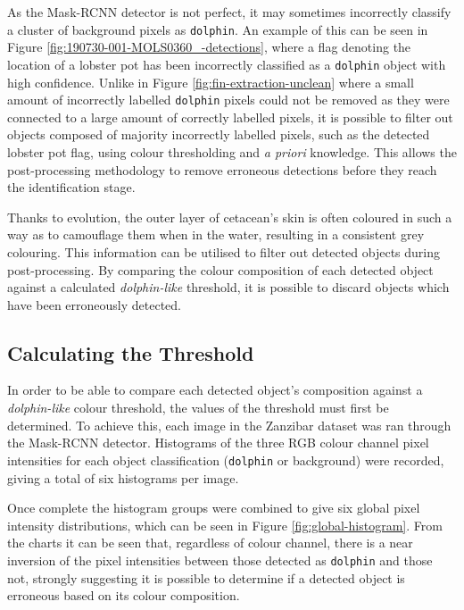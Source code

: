 As the Mask-RCNN detector is not perfect, it may sometimes incorrectly classify a cluster of background pixels as \texttt{dolphin}. An example of this can be seen in Figure \ref{fig:190730-001-MOLS0360_-detections}, where a flag denoting the location of a lobster pot has been incorrectly classified as a \texttt{dolphin} object with high confidence. Unlike in Figure \ref{fig:fin-extraction-unclean} where a small amount of incorrectly labelled \texttt{dolphin} pixels could not be removed as they were connected to a large amount of correctly labelled pixels, it is possible to filter out objects composed of majority incorrectly labelled pixels, such as the detected lobster pot flag, using colour thresholding and \textit{a priori} knowledge. This allows the post-processing methodology to remove erroneous detections before they reach the identification stage. 

Thanks to evolution, the outer layer of cetacean's skin is often coloured in such a way as to camouflage them when in the water, resulting in a consistent grey colouring. This information can be utilised to filter out detected objects during post-processing. By comparing the colour composition of each detected object against a calculated \textit{dolphin-like} threshold, it is possible to discard objects which have been erroneously detected. 

\subsection{Calculating the Threshold}\label{ch:postProcessing,sec:colourThresholding,subsec:calulating}

In order to be able to compare each detected object's composition against a \textit{dolphin-like} colour threshold, the values of the threshold must first be determined. To achieve this, each image in the Zanzibar dataset was ran through the Mask-RCNN detector. Histograms of the three RGB colour channel pixel intensities for each object classification (\texttt{dolphin} or background) were recorded, giving a total of six histograms per image. 

Once complete the histogram groups were combined to give six global pixel intensity distributions, which can be seen in Figure \ref{fig:global-histogram}. From the charts it can be seen that, regardless of colour channel, there is a near inversion of the pixel intensities between those detected as \texttt{dolphin} and those not, strongly suggesting it is possible to determine if a detected object is erroneous based on its colour composition.

